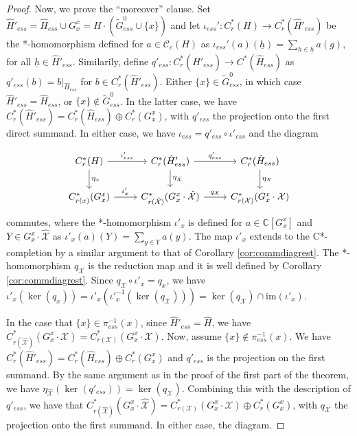 \documentclass[a4paper, 12pt]{amsart}
\theoremstyle{definition}
\theoremstyle{remark}
\numberwithin{equation}{section}
\begin{document}
\begin{proof}
Now, we prove the ``moreover'' clause. Set $\hat{H}'_{ess} = \hat{H}_{ess}\cup G^{x}_{x} = H\cdot (\tilde{G}_{ess}^{0}\cup \{x\})$ and let $\iota_{ess}':C^{*}_{r}(H)\to C^{*}_{r}(\hat{H}'_{ess})$ be the *-homomorphism defined for $a\in \mathscr{C}_{c}(H)$ as $\iota_{ess}'(a)(\underline{h}) = \sum_{h\in \underline{h}}a(g)$, for all $\underline{h}\in \hat{H}'_{ess}$. Similarily, define $q'_{ess}:C^{*}_{r}(\hat{H}'_{ess})\to C^{*}(\hat{H}_{ess})$ as $q'_{ess}(b) = b|_{\hat{H}_{ess}}$ for $b\in C^{*}_{r}(\hat{H}'_{ess})$. Either $\{x\}\in \tilde{G}_{ess}^{0}$, in which case $\hat{H}'_{ess} = \hat{H}_{ess}$, or $\{x\}\notin \tilde{G}_{ess}^{0}$. In the latter case, we have $C^{*}_{r}(\hat{H}'_{ess}) = C^{*}_{r}(\hat{H}_{ess})\oplus C^{*}_{r}(G^{x}_{x})$, with $q'_{ess}$ the projection onto the first direct summand. In either case, we have $\iota_{ess} = q'_{ess}\circ \iota'_{ess}$ and the diagram

$$
\begin{tikzcd}
C^{*}_{r}(H) \arrow[d, "\eta_{x}"] \arrow[r, "\iota'_{ess}"] & C^{*}_{r}(\hat{H}'_{ess}) \arrow[d, "\eta_{\hat{\mathcal{X}}}"] \arrow[r, "q'_{ess}"]      & C^{*}_{r}(\hat{H}_{ess}) \arrow[d, "\eta_{\mathcal{X}}"] \\
C^{*}_{r(x)}(G^{x}_{x}) \arrow[r, "\iota'_{x}"]               & C_{r(\hat{\mathcal{X}})}^{*}(G^{x}_{x}\cdot\hat{\mathcal{X}}) \arrow[r, "q_{\mathcal{X}}"] & C^{*}_{r(\mathcal{X})}(G^{x}_{x}\cdot\mathcal{X})       
\end{tikzcd}$$ commutes, where the *-homomorphism $\iota'_{x}$ is defined for $a\in\mathbb{C}[G^{x}_{x}]$ and $Y\in G^{x}_{x}\cdot\hat{\mathcal{X}}$ as $\iota'_{x}(a)(Y) = \sum_{y\in Y}a(y)$. The map $\iota'_{x}$ extends to the C*-completion by a similar argument to that of Corollary \ref{cor:commdiagrest}. The *-homomorphism $q_{\mathcal{X}}$ is the reduction map and it is well defined by Corollary \ref{cor:commdiagrest}. Since $q_{\mathcal{X}}\circ \iota'_{x} = q_{x}$, we have $\iota'_{x}(\ker(q_{x})) = \iota'_{x}(\iota'^{-1}_{x}(\ker(q_{\mathcal{X}}))) = \ker(q_{\mathcal{X}})\cap \text{im}(\iota'_{x})$.

 In the case that $\{x\}\in \pi^{-1}_{ess}(x)$, since $\hat{H}'_{ess} = \hat{H}$, we have  $C^{*}_{r(\hat{\mathcal{X}})}(G^{x}_{x}\cdot\mathcal{X}) = C^{*}_{r(\mathcal{X})}(G^{x}_{x}\cdot\mathcal{X})$. Now, assume $\{x\}\notin \pi^{-1}_{ess}(x)$. We have $C^{*}_{r}(\hat{H}'_{ess}) = C^{*}_{r}(\hat{H}_{ess})\oplus C^{*}_{r}(G^{x}_{x})$ and $q'_{ess}$ is the projection on the first summand. By the same argument as in the proof of the first part of the theorem, we have $\eta_{\hat{\mathcal{X}}}(\ker(q'_{ess})) = \ker(q_{\mathcal{X}})$. Combining this with the description of $q'_{ess}$, we have that $C^{*}_{r(\hat{\mathcal{X}})}(G^{x}_{x}\cdot\hat{\mathcal{X}}) = C^{*}_{r(\mathcal{X})}(G^{x}_{x}\cdot\mathcal{X})\oplus C^{*}_{r}(G^{x}_{x})$, with $q_{\mathcal{X}}$ the projection onto the first summand. In either case, the diagram.


\end{proof}
\end{document}
